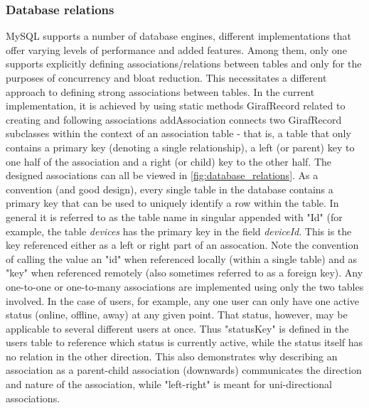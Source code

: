 \subsubsection{Database relations}
MySQL supports a number of database engines, different implementations that offer varying levels of performance and added features. Among them, only one supports explicitly defining associations/relations between tables and only for the purposes of concurrency and bloat reduction. This necessitates a different approach to defining strong associations between tables. In the current implementation, it is achieved by using static methods GirafRecord related to creating and following associations
addAssociation connects two GirafRecord subclasses within the context of an association table - that is, a table that only contains a primary key (denoting a single relationship), a left (or parent) key to one half of the association and a right (or child) key to the other half. The designed associations can all be viewed in \vref{fig:database_relations}.
As a convention (and good design), every single table in the database contains a primary key that can be used to uniquely identify a row within the table. In general it is referred to as the table name in singular appended with "Id" (for example, the table \emph{devices} has the primary key in the field \emph{deviceId}. This is the key referenced either as a left or right part of an assocation. Note the convention of calling the value an "id" when referenced locally (within a single table) and as "key" when referenced remotely (also sometimes referred to as a foreign key).
Any one-to-one or one-to-many associations are implemented using only the two tables involved. In the case of users, for example, any one user can only have one active status (online, offline, away) at any given point. That status, however, may be applicable to several different users at once. Thus "statusKey" is defined in the users table to reference which status is currently active, while the status itself has no relation in the other direction. This also demonstrates why describing an association as a parent-child association (downwards) communicates the direction and nature of the association, while "left-right" is meant for uni-directional associations.
